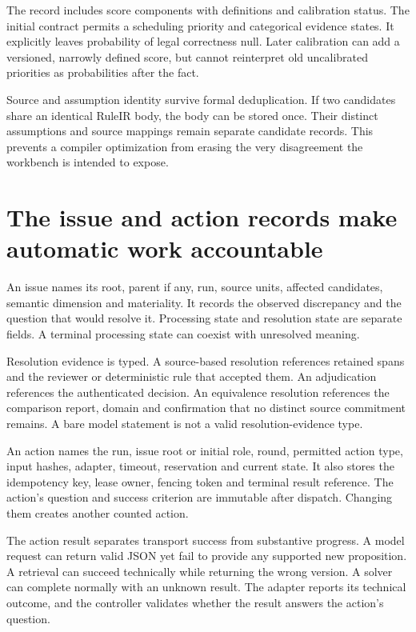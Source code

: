 The record includes score components with definitions and calibration status.
The initial contract permits a scheduling priority and categorical evidence
states. It explicitly leaves probability of legal correctness null. Later
calibration can add a versioned, narrowly defined score, but cannot reinterpret
old uncalibrated priorities as probabilities after the fact.

Source and assumption identity survive formal deduplication. If two candidates
share an identical RuleIR body, the body can be stored once. Their distinct
assumptions and source mappings remain separate candidate records. This prevents
a compiler optimization from erasing the very disagreement the workbench is
intended to expose.

\section{The issue and action records make automatic work accountable}
\label{merge:M08:04}


An issue names its root, parent if any, run, source units, affected candidates,
semantic dimension and materiality. It records the observed discrepancy and the
question that would resolve it. Processing state and resolution state are separate
fields. A terminal processing state can coexist with unresolved meaning.

Resolution evidence is typed. A source-based resolution references retained spans
and the reviewer or deterministic rule that accepted them. An adjudication
references the authenticated decision. An equivalence resolution references the
comparison report, domain and confirmation that no distinct source commitment
remains. A bare model statement is not a valid resolution-evidence type.

An action names the run, issue root or initial role, round, permitted action type,
input hashes, adapter, timeout, reservation and current state. It also stores the
idempotency key, lease owner, fencing token and terminal result reference. The
action's question and success criterion are immutable after dispatch. Changing
them creates another counted action.

The action result separates transport success from substantive progress. A model
request can return valid JSON yet fail to provide any supported new proposition.
A retrieval can succeed technically while returning the wrong version. A solver
can complete normally with an unknown result. The adapter reports its technical
outcome, and the controller validates whether the result answers the action's
question.

